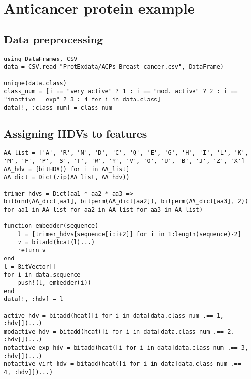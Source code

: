 \section{Anticancer protein example}
\subsection{Data preprocessing}
\begin{verbatim}
using DataFrames, CSV
data = CSV.read("ProtExdata/ACPs_Breast_cancer.csv", DataFrame)

unique(data.class)
class_num = [i == "very active" ? 1 : i == "mod. active" ? 2 : i == "inactive - exp" ? 3 : 4 for i in data.class]
data[!, :class_num] = class_num
\end{verbatim}
\subsection{Assigning HDVs to features}
\begin{verbatim}
AA_list = ['A', 'R', 'N', 'D', 'C', 'Q', 'E', 'G', 'H', 'I', 'L', 'K', 'M', 'F', 'P', 'S', 'T', 'W', 'Y', 'V', 'O', 'U', 'B', 'J', 'Z', 'X']
AA_hdv = [bitHDV() for i in AA_list]
AA_dict = Dict(zip(AA_list, AA_hdv))

trimer_hdvs = Dict(aa1 * aa2 * aa3 => 
bitbind(AA_dict[aa1], bitperm(AA_dict[aa2]), bitperm(AA_dict[aa3], 2)) 
for aa1 in AA_list for aa2 in AA_list for aa3 in AA_list)

function embedder(sequence)
    l = [trimer_hdvs[sequence[i:i+2]] for i in 1:length(sequence)-2]
    v = bitadd(hcat(l)...)
    return v
end
l = BitVector[]
for i in data.sequence
    push!(l, embedder(i))
end
data[!, :hdv] = l

active_hdv = bitadd(hcat([i for i in data[data.class_num .== 1, :hdv]])...)
modactive_hdv = bitadd(hcat([i for i in data[data.class_num .== 2, :hdv]])...)
notactive_exp_hdv = bitadd(hcat([i for i in data[data.class_num .== 3, :hdv]])...)
notactive_virt_hdv = bitadd(hcat([i for i in data[data.class_num .== 4, :hdv]])...)
\end{verbatim}
